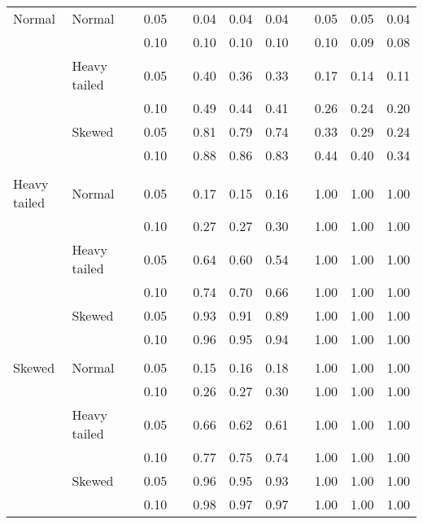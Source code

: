 \begin{table}[ht]
\begin{scriptsize}
\begin{tabular}{ll p{.1cm} c p{.1cm} rrr p{.1cm} rrr}
\rowcolor{gray!20}Normal       & Normal       && 0.05 &&   0.04 & 0.04 & 0.04 && 0.05 & 0.05 & 0.04 \\ 
\rowcolor{gray!20}             &              && 0.10 &&   0.10 & 0.10 & 0.10 && 0.10 & 0.09 & 0.08 \\ 
\rowcolor{gray!20}             & Heavy tailed && 0.05 &&   0.40 & 0.36 & 0.33 && 0.17 & 0.14 & 0.11 \\ 
\rowcolor{gray!20}             &              && 0.10 &&   0.49 & 0.44 & 0.41 && 0.26 & 0.24 & 0.20 \\ 
\rowcolor{gray!20}             & Skewed       && 0.05 &&   0.81 & 0.79 & 0.74 && 0.33 & 0.29 & 0.24 \\ 
\rowcolor{gray!20}             &              && 0.10 &&   0.88 & 0.86 & 0.83 && 0.44 & 0.40 & 0.34 \\ 
             &&&&&&&&&&&\\
Heavy tailed & Normal       && 0.05 &&   0.17 & 0.15 & 0.16 && 1.00 & 1.00 & 1.00 \\ 
             &              && 0.10 &&   0.27 & 0.27 & 0.30 && 1.00 & 1.00 & 1.00 \\ 
             & Heavy tailed && 0.05 &&   0.64 & 0.60 & 0.54 && 1.00 & 1.00 & 1.00 \\ 
             &              && 0.10 &&   0.74 & 0.70 & 0.66 && 1.00 & 1.00 & 1.00 \\ 
             & Skewed       && 0.05 &&   0.93 & 0.91 & 0.89 && 1.00 & 1.00 & 1.00 \\ 
             &              && 0.10 &&   0.96 & 0.95 & 0.94 && 1.00 & 1.00 & 1.00 \\ 
             &&&&&&&&&&&\\
Skewed       & Normal       && 0.05 &&   0.15 & 0.16 & 0.18 && 1.00 & 1.00 & 1.00 \\ 
             &              && 0.10 &&   0.26 & 0.27 & 0.30 && 1.00 & 1.00 & 1.00 \\ 
             & Heavy tailed && 0.05 &&   0.66 & 0.62 & 0.61 && 1.00 & 1.00 & 1.00 \\ 
             &              && 0.10 &&   0.77 & 0.75 & 0.74 && 1.00 & 1.00 & 1.00 \\ 
             & Skewed       && 0.05 &&   0.96 & 0.95 & 0.93 && 1.00 & 1.00 & 1.00 \\ 
             &              && 0.10 &&   0.98 & 0.97 & 0.97 && 1.00 & 1.00 & 1.00 \\ 


   \hline
\end{tabular}
\end{scriptsize}
\end{table}

